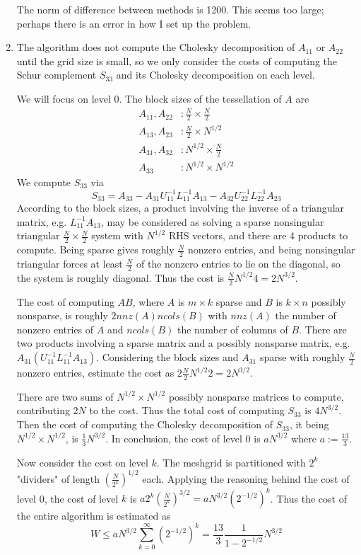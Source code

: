 \documentclass{article}
\newcommand{\br}[1]{\left(#1\right)}
\newcommand{\inv}{^{-1}}
\begin{document}
\begin{enumerate}
	The norm of difference between methods is 1200. This seems too large; perhaps there is an error in how I set up the problem.
	
	
	
	\pagebreak
	
	
	
	\item The algorithm does not compute the Cholesky decomposition of $A_{11}$ or $A_{22}$ until the grid size is small, so we only consider the costs of computing the Schur complement $S_{33}$ and its Cholesky decomposition on each level.
	
	We will focus on level 0. The block sizes of the tessellation of $A$ are
	\begin{align*}
		A_{11},A_{22}&: \frac N2\times\frac N2 \\
		A_{13},A_{23}&: \frac N2\times N^{1/2} \\
		A_{31},A_{32}&: N^{1/2}\times\frac N2 \\
		A_{33}&: N^{1/2}\times N^{1/2}
	\end{align*}
	We compute $S_{33}$ via
	\[S_{33} = A_{33} - A_{31}U_{11}\inv L_{11}\inv A_{13} - A_{32} U_{22}\inv L_{22}\inv A_{23}\]
	According to the block sizes, a product involving the inverse of a triangular matrix, e.g. $L_{11}\inv A_{13}$, may be considered as solving a sparse nonsingular triangular $\frac N2\times\frac N2$ system with $N^{1/2}$ RHS vectors, and there are 4 products to compute. Being sparse gives roughly $\frac N2$ nonzero entries, and being nonsingular triangular forces at least $\frac N2$ of the nonzero entries to lie on the diagonal, so the system is roughly diagonal. Thus the cost is $\frac N2N^{1/2}4=2N^{3/2}$.
	
	The cost of computing $AB$, where $A$ is $m\times k$ sparse and $B$ is $k\times n$ possibly nonsparse, is roughly $2nnz(A)ncols(B)$ with $nnz(A)$ the number of nonzero entries of $A$ and $ncols(B)$ the number of columns of $B$. There are two products involving a sparse matrix and a possibly nonsparse matrix, e.g. $A_{31}(U_{11}\inv L_{11}\inv A_{13})$. Considering the block sizes and $A_{31}$ sparse with roughly $\frac N2$ nonzero entries, estimate the cost as $2\frac N2N^{1/2}2=2N^{3/2}$.
	
	There are two sums of $N^{1/2}\times N^{1/2}$ possibly nonsparse matrices to compute, contributing $2N$ to the cost. Thus the total cost of computing $S_{33}$ is $4N^{3/2}$. Then the cost of computing the Cholesky decomposition of $S_{33}$, it being $N^{1/2}\times N^{1/2}$, is $\frac13N^{3/2}$. In conclusion, the cost of level 0 is $aN^{3/2}$ where $a:=\frac{13}{3}$.
	
	Now consider the cost on level $k$. The meshgrid is partitioned with $2^k$ "dividers" of length $\br{\frac{N}{2^k}}^{1/2}$ each. Applying the reasoning behind the cost of level 0, the cost of level $k$ is $a2^k\br{\frac{N}{2^k}}^{3/2} = aN^{3/2}(2^{-1/2})^k$. Thus the cost of the entire algorithm is estimated as
	\[W \le aN^{3/2}\sum_{k=0}^\infty (2^{-1/2})^k = \frac{13}{3}\frac{1}{1-2^{-1/2}}N^{3/2}\]
	
	
	
\end{enumerate}
	
	
\end{document}
